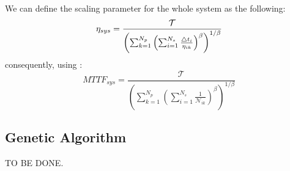We can define the scaling parameter for the whole system as the following:
\[
  \eta_{sys} = \frac{\mathcal{T}}{\left(\sum_{k=1}^{N_p} \left(\sum_{i=1}^{N_s}\frac{\triangle t_i}{\eta_{ik}}\right)^{\beta} \right)^{1/\beta}} \\
\]
consequently, using :
\[
  MTTF_{sys} = \frac{\mathcal{T}}{\left(\sum_{k=1}^{N_p} \left(\sum_{i=1}^{N_s}\frac{1}{\mathcal{N}_{ik}}\right)^{\beta} \right)^{1/\beta}}
\]

\subsection{Genetic Algorithm}
TO BE DONE.
